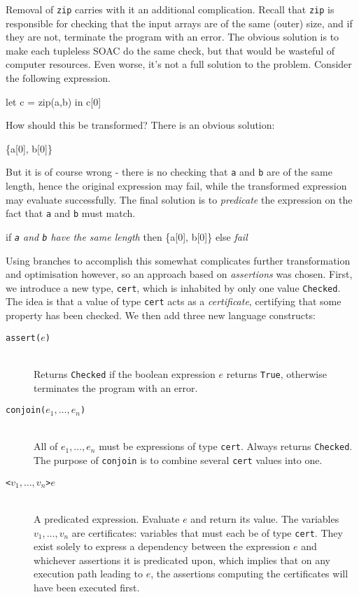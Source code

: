 Removal of \texttt{zip} carries with it an additional complication.
Recall that \texttt{zip} is responsible for checking that the input
arrays are of the same (outer) size, and if they are not, terminate
the program with an error.  The obvious solution is to make each
tupleless SOAC do the same check, but that would be wasteful of
computer resources.  Even worse, it's not a full solution to the
problem.  Consider the following expression.
\begin{colorcode}
let c = zip(a,b) in
c[0]
\end{colorcode}
How should this be transformed?  There is an obvious solution:
\begin{colorcode}
\{a[0], b[0]\}
\end{colorcode}
But it is of course wrong - there is no checking that \texttt{a} and
\texttt{b} are of the same length, hence the original expression may
fail, while the transformed expression may evaluate successfully.  The
final solution is to \textit{predicate} the expression on the fact
that \texttt{a} and \texttt{b} must match.
\begin{colorcode}
if \textit{\texttt{a} and \texttt{b} have the same length}
then \{a[0], b[0]\}
else \textit{fail}
\end{colorcode}
Using branches to accomplish this somewhat complicates further
transformation and optimisation however, so an approach based on
\textit{assertions} was chosen.  First, we introduce a new type,
\texttt{cert}, which is inhabited by only one value \texttt{Checked}.
The idea is that a value of type \texttt{cert} acts as a
\textit{certificate}, certifying that some property has been checked.
We then add three new language constructs:

\begin{description}
\item[\texttt{assert($e$)}]\hfill\\
  Returns \texttt{Checked} if the boolean expression $e$ returns
  \texttt{True}, otherwise terminates the program with an error.

\item[\texttt{conjoin($e_{1}, \ldots, e_{n}$)}]\hfill\\
  All of $e_{1}, \ldots, e_{n}$ must be expressions of type
  \texttt{cert}.  Always returns \texttt{Checked}.  The purpose of
  \texttt{conjoin} is to combine several \texttt{cert} values into
  one.

\item[\texttt{<$v_{1},\ldots,v_{n}$>$e$}]\hfill\\
  A predicated expression.  Evaluate $e$ and return its value.  The
  variables $v_{1},\ldots,v_{n}$ are certificates: variables that must
  each be of type \texttt{cert}.  They exist solely to express a
  dependency between the expression $e$ and whichever assertions it is
  predicated upon, which implies that on any execution path leading to
  $e$, the assertions computing the certificates will have been
  executed first.
\end{description}

